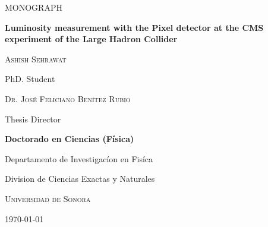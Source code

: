 \documentclass[final,11p]{CSP}
\def\Student{Ashish Sehrawat}
\def\Director{Dr. Jos\'{e} Feliciano Ben\'{i}tez Rubio}
\def\Title{MONOGRAPH}
\def\Prog{Doctorado en Ciencias (F\'{i}sica) }
\def\Dept{Departamento de Investigac\'{i}on en Fis\'{i}ca}
\def\Division{Division de Ciencias Exactas y Naturales}
\def\Universidad{Universidad de Sonora}
\def\ProjectTitle{Luminosity measurement with the Pixel detector at the CMS experiment of the Large Hadron Collider }
\def\ResearchLine{Astrof\'{i}sica, Cosmolog\'{i}a y F\'{i}sica de Part\'{i}culas}
\begin{document}
\begin{titlepage}
  \centering
  \hspace{0pt}
  \vfill
        {\scshape\Large \Title \par}

	\vspace{2cm}
            {\large \bf \ProjectTitle \par}


        
        \vspace{4cm}
	{\scshape\large \Student \par}
        {PhD. Student\par}

        \vspace{1cm}
	{\scshape \Director \par}
        {Thesis Director\par}

        \vspace{1cm}
        {\bf \Prog \par}
        {\Dept \par}
        {\Division \par}
        {\scshape \Universidad \par}

        \vspace{4cm}
	{\today}

\hspace{0pt}
\vfill

\end{titlepage}
\shipout\null

\newpage
\hspace{11pt}
\end{document}
